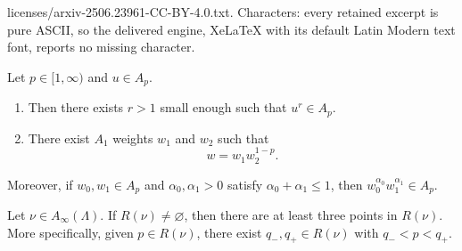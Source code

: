 \documentclass[10pt,a4paper]{amsart}
\begin{document}
licenses/arxiv-2506.23961-CC-BY-4.0.txt. Characters: every retained excerpt is pure ASCII, so the delivered engine, XeLaTeX with its default Latin Modern text font, reports no missing character.
\begin{lemma}\label{lemma:improvingA1}    Let $p\in [1,\infty)$ and $u\in A_p$. 
\begin{enumerate}
\item  Then there exists $r>1$ small enough such that $u^r\in A_p$.
\item There exist $A_1$ weights $w_1$ and $w_2$ such that
\[
w=w_1 w_2^{1-p} .
\]
\end{enumerate}


Moreover, if $w_0,w_1\in A_p$ and $\alpha_0,\alpha_1>0$ satisfy $\alpha_0+\alpha_1\leq 1$, then $w_0^{\alpha_0}w_1^{\alpha_1}\in A_p$.

\end{lemma}

\begin{lemma}\label{lemma:lemma1RangeSolvability}
    Let $\nu\in A_{\infty}(\Lambda)$. If $R(\nu)\neq\varnothing$, then there are at least three points in $R(\nu)$. More specifically, given $p\in R(\nu)$, there exist $q_{-},q_{+}\in R(\nu)$ with $q_{-}<p<q_{+}$. 
\end{lemma}
\end{document}
